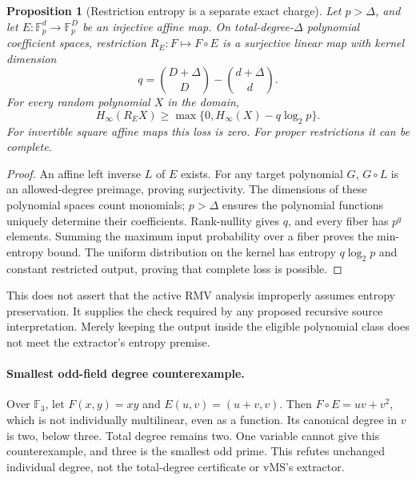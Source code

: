 \documentclass[11pt]{article}
\newtheorem{proposition}{Proposition}
\begin{document}
\begin{proposition}[Restriction entropy is a separate exact charge]
Let $p>\Delta$, and let $E:\mathbb F_p^d\to\mathbb F_p^D$ be an
injective affine map. On total-degree-$\Delta$ polynomial coefficient
spaces, restriction $R_E:F\mapsto F\circ E$ is a surjective linear map
with kernel dimension
\[
 q=\binom{D+\Delta}{D}-\binom{d+\Delta}{d}.
\]
For every random polynomial $X$ in the domain,
\[
 H_\infty(R_E X)\ge\max\{0,H_\infty(X)-q\log_2p\}.
\]
For invertible square affine maps this loss is zero. For proper
restrictions it can be complete.
\end{proposition}
\begin{proof}
An affine left inverse $L$ of $E$ exists. For any target polynomial $G$,
$G\circ L$ is an allowed-degree preimage, proving surjectivity. The
dimensions of these polynomial spaces count monomials; $p>\Delta$
ensures the polynomial functions uniquely determine their coefficients.
Rank-nullity gives $q$, and every fiber has $p^q$ elements. Summing the
maximum input probability over a fiber proves the min-entropy bound.
The uniform distribution on the kernel has entropy $q\log_2p$ and
constant restricted output, proving that complete loss is possible.
\end{proof}
This does not assert that the active RMV analysis improperly assumes
entropy preservation. It supplies the check required by any proposed
recursive source interpretation. Merely keeping the output inside the
eligible polynomial class does not meet the extractor's entropy premise.

\paragraph{Smallest odd-field degree counterexample.}
Over $\mathbb F_3$, let $F(x,y)=xy$ and $E(u,v)=(u+v,v)$.
Then $F\circ E=uv+v^2$, which is not individually multilinear, even as
a function. Its canonical degree in $v$ is two, below three. Total degree
remains two. One variable cannot give this counterexample, and three is
the smallest odd prime. This refutes unchanged individual degree, not
the total-degree certificate or vMS's extractor.
\end{document}
